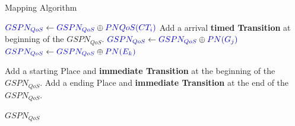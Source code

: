 \documentclass[xcolor=svgnames]{beamer}
\begin{document}
\begin{frame}{Mapping Algorithm}
\begin{algorithm}[H]
\begin{algorithmic}
{{			    %

			      \STATE $\textcolor{componentColor}{ GSPN_{QoS} } \leftarrow \textcolor{componentColor}{ GSPN_{QoS} } \oplus \textcolor{componentColor}{ PNQoS(CT_i) } $  		
			      \STATE Add a arrival \textbf{timed Transition} at beginning of the \textcolor{componentColor}{$GSPN_{QoS}$}.
			  \ENDFOR
			      \STATE $\textcolor{componentColor}{ GSPN_{QoS} } \leftarrow \textcolor{componentColor}{GSPN_{QoS}} \oplus \textcolor{componentColor}{ PN(G_j) }$	
			  \ENDFOR	
			      \STATE $\textcolor{componentColor}{ GSPN_{QoS} } \leftarrow \textcolor{componentColor}{ GSPN_{QoS} } \oplus \textcolor{componentColor}{ PN(E_k) }$  	
			  \ENDFOR

			  \STATE Add a starting Place and \textbf{immediate Transition} at the beginning of the \textcolor{componentColor}{ $GSPN_{QoS}$}.	
			  \STATE Add a ending Place and \textbf{immediate Transition} at the end of the \textcolor{componentColor}{$GSPN_{QoS}$}.	

			  \RETURN \textcolor{componentColor}{$GSPN_{QoS}$}
		}
	      }	
	
	\end{algorithmic}

      \end{algorithm}
  \end{frame}
\end{document}
